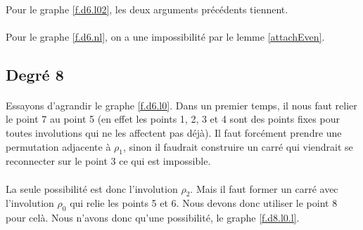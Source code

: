 \paragraph{}
Pour le graphe \ref{f.d6.l02}, les deux arguments précédents tiennent.

\paragraph{}
Pour le graphe \ref{f.d6.nl}, on a une impossibilité par le lemme \ref{attachEven}.

\subsection{Degré 8}

\paragraph{}
Essayons d'agrandir le graphe \ref{f.d6.l0}. Dans un premier temps, il nous faut relier le point 7 au point 5 (en effet les points 1, 2, 3 et 4 sont des points fixes pour toutes involutions qui ne les affectent pas déjà). Il faut forcément prendre une permutation adjacente à $\rho_1$, sinon il faudrait construire un carré qui viendrait se reconnecter sur le point 3 ce qui est impossible.

\paragraph{}
La seule possibilité est donc l'involution $\rho_2$. Mais il faut former un carré avec l'involution $\rho_0$ qui relie les points 5 et 6. Nous devons donc utiliser le point 8 pour celà. Nous n'avons donc qu'une possibilité, le graphe \ref{f.d8.l0.l}.

